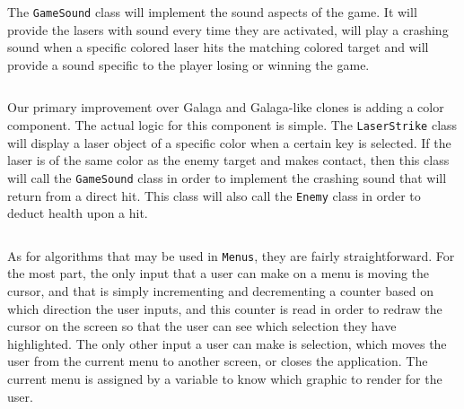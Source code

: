 \inputminted[baselinestretch=1]{python}{../code/RenderedBase.py}

The \texttt{GameSound} class will implement the sound
aspects of the game.  It will provide the lasers with sound every
time they are activated, will play a crashing sound when a specific
colored laser hits the matching colored target and will provide a
sound specific to the player losing or winning the game.

\inputminted[baselinestretch=1]{python}{../code/GameSound.py}

Our primary improvement over Galaga and Galaga-like clones is
adding a color component.  The actual logic for this component
is simple.  The \texttt{LaserStrike} class will display a
laser object of a specific color when a certain key is selected. If
the laser is of the same color as the enemy target and makes contact,
then this class will call the \texttt{GameSound} class
in order to implement the crashing sound that will return from a
direct hit. This class will also call the \texttt{Enemy}
class in order to deduct health upon a hit.

\inputminted[baselinestretch=1]{python}{../code/LaserStrike.py}

As for algorithms that may be used in \texttt{Menus}, they
are fairly straightforward. For the most part, the only input that a
user can make on a menu is moving the cursor, and that is simply
incrementing and decrementing a counter based on which direction the
user inputs, and this counter is read in order to redraw the cursor on
the screen so that the user can see which selection they have highlighted.
The only other input a user can make is selection, which moves the user
from the current menu to another screen, or closes the application. The
current menu is assigned by a variable to know which graphic to render for
the user.


